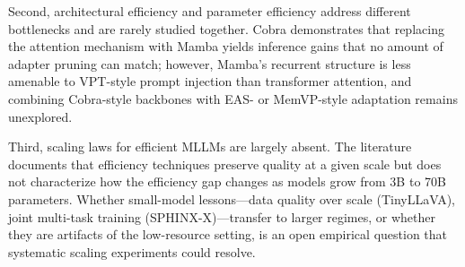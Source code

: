 Second, architectural efficiency and parameter efficiency address different bottlenecks and are rarely studied together. Cobra demonstrates that replacing the attention mechanism with Mamba yields inference gains that no amount of adapter pruning can match; however, Mamba's recurrent structure is less amenable to VPT-style prompt injection than transformer attention, and combining Cobra-style backbones with EAS- or MemVP-style adaptation remains unexplored.

Third, scaling laws for efficient MLLMs are largely absent. The literature documents that efficiency techniques preserve quality at a given scale but does not characterize how the efficiency gap changes as models grow from 3B to 70B parameters. Whether small-model lessons---data quality over scale (TinyLLaVA), joint multi-task training (SPHINX-X)---transfer to larger regimes, or whether they are artifacts of the low-resource setting, is an open empirical question that systematic scaling experiments could resolve.

